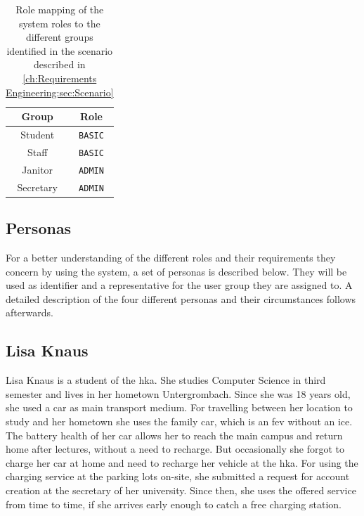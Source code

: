 \begin{table}[h!]
    \centering
    \begin{tabular}{c|c}
        Group & Role \\
        \hline
        Student & \verb|BASIC| \\
        Staff & \verb|BASIC| \\
        Janitor & \verb|ADMIN| \\
        Secretary & \verb|ADMIN|
    \end{tabular}
    \caption{Role mapping of the system roles to the different groups identified in the scenario described in \ref{ch:Requirements Engineering:sec:Scenario}}
    \label{tab:role_mapping_scenario}
\end{table}


\subsection{Personas}
\label{ch:Requirements Engineering:sec:Personas}

For a better understanding of the different roles and their requirements they concern by using the system, a set of personas is described below. They will be used as identifier and a representative for the user group they are assigned to. A detailed description of the four different personas and their circumstances follows afterwards.

\subsection{Lisa Knaus}
\label{ch:Requirements Engineering:sec:Personas:ssec:Lisa Knaus}

Lisa Knaus is a student of the \acrshort{hka}. She studies Computer Science in third semester and lives in her hometown Untergrombach. Since she was 18 years old, she used a car as main transport medium. For travelling between her location to study and her hometown she uses the family car, which is an \acrfull{fev} without an \acrfull{ice}. The battery health of her car allows her to reach the main campus and return home after lectures, without a need to recharge. But occasionally she forgot to charge her car at home and need to recharge her vehicle at the \acrshort{hka}. For using the charging service at the parking lots on-site, she submitted a request for account creation at the secretary of her university. Since then, she uses the offered service from time to time, if she arrives early enough to catch a free charging station.

